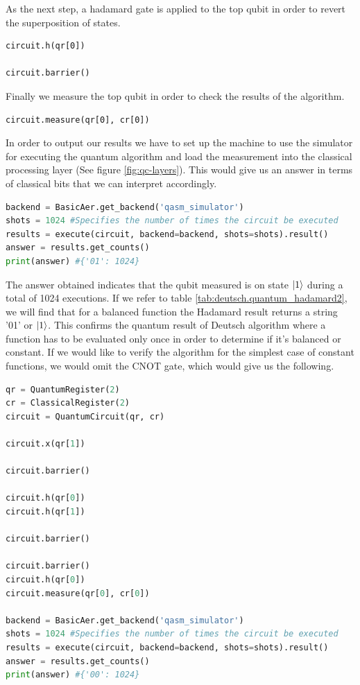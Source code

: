 \documentclass[12pt,a4paper]{scrartcl}
\begin{document}
As the next step, a hadamard gate is applied to the top qubit in order to revert the superposition of states.
\begin{lstlisting}
circuit.h(qr[0])

circuit.barrier()
\end{lstlisting}
Finally we measure the top qubit in order to check the results of the algorithm.

\begin{lstlisting}
circuit.measure(qr[0], cr[0])
\end{lstlisting}

In order to output our results we have to set up the machine to use the simulator for executing the quantum algorithm and load the measurement into the classical processing layer (See figure \ref{fig:qc-layers}). This would give us an answer in terms of classical bits that we can interpret accordingly.

\begin{lstlisting}[language=python]
backend = BasicAer.get_backend('qasm_simulator')
shots = 1024 #Specifies the number of times the circuit be executed 
results = execute(circuit, backend=backend, shots=shots).result()
answer = results.get_counts()
print(answer) #{'01': 1024}
\end{lstlisting}
The answer obtained indicates that the qubit measured is on state $\ket{1}$ during a total of 1024 executions. If we refer to table \ref{tab:deutsch.quantum_hadamard2}, we will find that for a balanced function the Hadamard result returns a string '01' or $\ket{1}$. This confirms the quantum result of Deutsch algorithm where a function has to be evaluated only once in order to determine if it's balanced or constant. If we would like to verify the algorithm for the simplest case of constant functions, we would omit the CNOT gate, which would give us the following.

\begin{lstlisting}[language = python]
qr = QuantumRegister(2)  
cr = ClassicalRegister(2) 
circuit = QuantumCircuit(qr, cr)

circuit.x(qr[1]) 

circuit.barrier()

circuit.h(qr[0])
circuit.h(qr[1])

circuit.barrier()

circuit.barrier()
circuit.h(qr[0])
circuit.measure(qr[0], cr[0])

backend = BasicAer.get_backend('qasm_simulator')
shots = 1024 #Specifies the number of times the circuit be executed 
results = execute(circuit, backend=backend, shots=shots).result()
answer = results.get_counts()
print(answer) #{'00': 1024}
\end{lstlisting}
\end{document}
